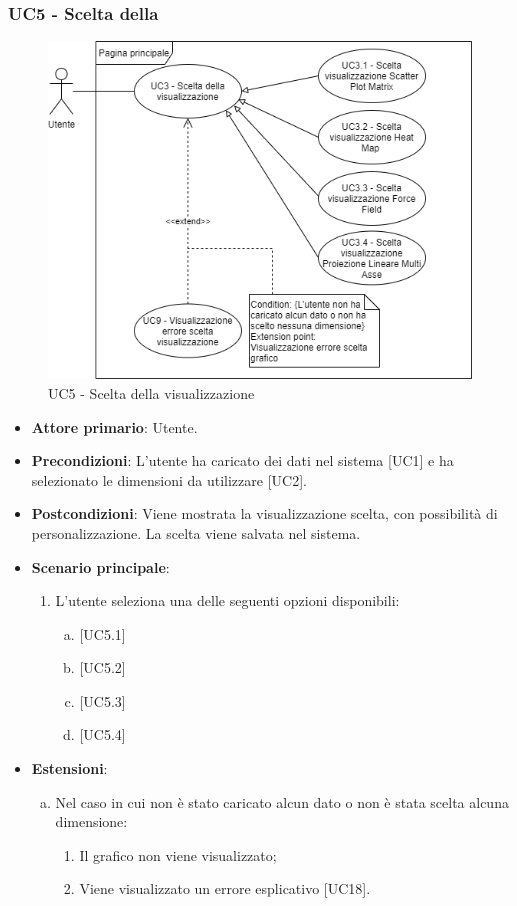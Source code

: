 \subsubsection{UC5 - Scelta della }
\begin{figure}[h]
\includegraphics[width=\linewidth]{section/Images/UC3.png}
\centering
\caption{UC5 - Scelta della visualizzazione}
\end{figure}
\begin{itemize}
	\item \textbf{Attore primario}: Utente.
	\item \textbf{Precondizioni}: L'utente ha caricato dei dati nel sistema [UC1] e ha selezionato le dimensioni da utilizzare [UC2].
	\item \textbf{Postcondizioni}: Viene mostrata la visualizzazione scelta, con possibilità di personalizzazione. La scelta viene salvata nel sistema.
	\item \textbf{Scenario principale}:
\begin{enumerate}
	\item	L'utente seleziona una delle seguenti opzioni disponibili:
		\begin{enumerate}[(a)]
			\item {}
			\item {}
			\item {}
			\item {}
		\end{enumerate}
\end{enumerate}
	\item \textbf{Estensioni}:
	\begin{enumerate}[(a)]
		\item Nel caso in cui non è stato caricato alcun dato o non è stata scelta alcuna dimensione:
		\begin{enumerate}[1.]
			\item Il grafico non viene visualizzato;
			\item Viene visualizzato un errore esplicativo [UC18].
		\end{enumerate}
	\end{enumerate}
\end{itemize}